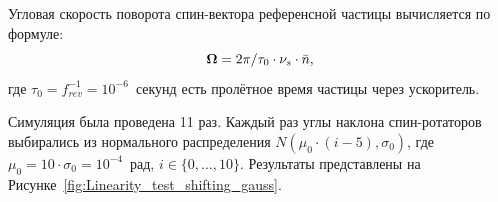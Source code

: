 Угловая скорость поворота спин-вектора референсной частицы вычисляется по формуле:~\cite[стр.~4]{COSY:SpinTuneMapping}
\[
\boldsymbol{\Omega} = 2\pi/\tau_0\cdot \nu_s \cdot \bar n,
\]
где ${\tau_0 = f^{-1}_{rev} = 10^{-6}}$~секунд есть пролётное время частицы через ускоритель.

Симуляция была проведена 11 раз. Каждый раз углы наклона
спин-ротаторов выбирались из нормального распределения
${N(\mu_0\cdot(i-5), \sigma_0)}$, где ${\mu_0 = 10\cdot \sigma_0 =10^{-4}}$~рад, 
${i\in\lbrace0,\dots, 10\rbrace}$. Результаты представлены
на Рисунке~\ref{fig:Linearity_test_shifting_gauss}.

\begin{figure}[H]
	\centering
\end{figure}
